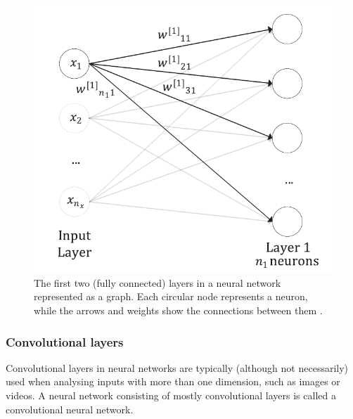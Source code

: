 \documentclass[11pt,a4paper,onecolumn]{report}
\begin{document}
\begin{figure}[t]
  \centering
  \includegraphics[width=0.5\linewidth]{ann.png}
  \caption{The first two (fully connected) layers in a neural network
  represented as a graph. Each circular node represents a neuron, while the
  arrows and weights show the connections between them \citep{michelucci2018}.}
  \label{fig:fully_connected}
\end{figure}

\subsubsection{Convolutional layers}
\label{sec:convolutional}
Convolutional layers in neural networks are typically (although not necessarily)
used when analysing inputs with more than one dimension, such as images or
videos. A neural network consisting of mostly convolutional layers is called a
convolutional neural network. \\
\end{document}
